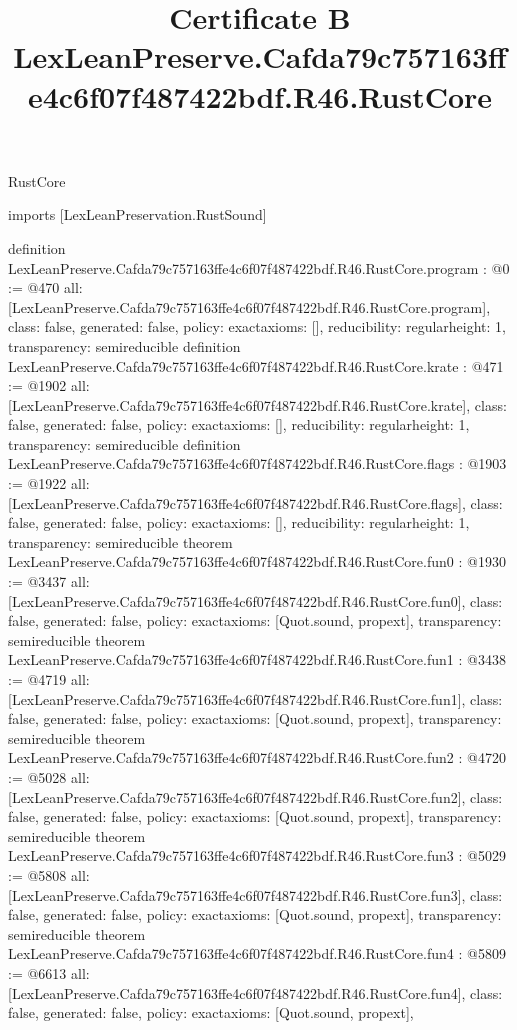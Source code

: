 \begin{lexlean}{RustCore}
\title{Certificate B LexLeanPreserve.Cafda79c757163ffe4c6f07f487422bdf.R46.RustCore}
\begin{coremodule}
imports [LexLeanPreservation.RustSound]

definition LexLeanPreserve.Cafda79c757163ffe4c6f07f487422bdf.R46.RustCore.program : @0 := @470 {
  all: [LexLeanPreserve.Cafda79c757163ffe4c6f07f487422bdf.R46.RustCore.program],
  class: false,
  generated: false,
  policy: exact{axioms: []},
  reducibility: regular{height: 1},
  transparency: semireducible
}
definition LexLeanPreserve.Cafda79c757163ffe4c6f07f487422bdf.R46.RustCore.krate : @471 := @1902 {
  all: [LexLeanPreserve.Cafda79c757163ffe4c6f07f487422bdf.R46.RustCore.krate],
  class: false,
  generated: false,
  policy: exact{axioms: []},
  reducibility: regular{height: 1},
  transparency: semireducible
}
definition LexLeanPreserve.Cafda79c757163ffe4c6f07f487422bdf.R46.RustCore.flags : @1903 := @1922 {
  all: [LexLeanPreserve.Cafda79c757163ffe4c6f07f487422bdf.R46.RustCore.flags],
  class: false,
  generated: false,
  policy: exact{axioms: []},
  reducibility: regular{height: 1},
  transparency: semireducible
}
theorem LexLeanPreserve.Cafda79c757163ffe4c6f07f487422bdf.R46.RustCore.fun0 : @1930 := @3437 {
  all: [LexLeanPreserve.Cafda79c757163ffe4c6f07f487422bdf.R46.RustCore.fun0],
  class: false,
  generated: false,
  policy: exact{axioms: [Quot.sound, propext]},
  transparency: semireducible
}
theorem LexLeanPreserve.Cafda79c757163ffe4c6f07f487422bdf.R46.RustCore.fun1 : @3438 := @4719 {
  all: [LexLeanPreserve.Cafda79c757163ffe4c6f07f487422bdf.R46.RustCore.fun1],
  class: false,
  generated: false,
  policy: exact{axioms: [Quot.sound, propext]},
  transparency: semireducible
}
theorem LexLeanPreserve.Cafda79c757163ffe4c6f07f487422bdf.R46.RustCore.fun2 : @4720 := @5028 {
  all: [LexLeanPreserve.Cafda79c757163ffe4c6f07f487422bdf.R46.RustCore.fun2],
  class: false,
  generated: false,
  policy: exact{axioms: [Quot.sound, propext]},
  transparency: semireducible
}
theorem LexLeanPreserve.Cafda79c757163ffe4c6f07f487422bdf.R46.RustCore.fun3 : @5029 := @5808 {
  all: [LexLeanPreserve.Cafda79c757163ffe4c6f07f487422bdf.R46.RustCore.fun3],
  class: false,
  generated: false,
  policy: exact{axioms: [Quot.sound, propext]},
  transparency: semireducible
}
theorem LexLeanPreserve.Cafda79c757163ffe4c6f07f487422bdf.R46.RustCore.fun4 : @5809 := @6613 {
  all: [LexLeanPreserve.Cafda79c757163ffe4c6f07f487422bdf.R46.RustCore.fun4],
  class: false,
  generated: false,
  policy: exact{axioms: [Quot.sound, propext]},
}
\end{coremodule}
\end{lexlean}

